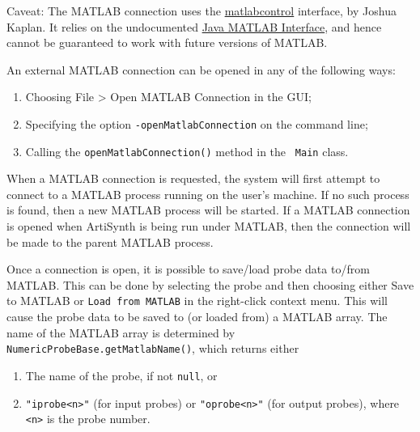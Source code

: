 \documentclass{article}
\begin{document}
\begin{sideblock}
Caveat: The MATLAB connection uses the
\href{https://code.google.com/p/matlabcontrol}{matlabcontrol}
interface, by Joshua Kaplan. It relies on the undocumented
\href{https://code.google.com/p/wiki/JMI}{Java MATLAB Interface}, and
hence cannot be guaranteed to work with future versions of MATLAB.
\end{sideblock}

An external MATLAB connection can be opened in any of the following
ways:

\begin{enumerate}

\item Choosing {\sf File > Open MATLAB Connection} in the GUI;

\item Specifying the option {\tt -openMatlabConnection} on
the command line;

\item Calling the {\tt openMatlabConnection()} method in the {\tt
Main} class.

\end{enumerate}

\begin{sideblock}
When a MATLAB connection is requested, the system will first attempt
to connect to a MATLAB process running on the user's machine. If no
such process is found, then a new MATLAB process will be started.  If
a MATLAB connection is opened when ArtiSynth is being run under
MATLAB, then the connection will be made to the parent MATLAB process.
\end{sideblock}

Once a connection is open, it is possible to save/load probe data
to/from MATLAB. This can be done by selecting the probe and then
choosing either {\sf Save to MATLAB} or {\tt Load from MATLAB} in the
right-click context menu. This will cause the probe data to be saved
to (or loaded from) a MATLAB array. The name of the MATLAB array is
determined by {\tt NumericProbeBase.getMatlabName()}, which returns
either

\begin{enumerate}

\item The name of the probe, if not {\tt null}, or

\item {\tt "iprobe<n>"} (for input probes) or {\tt "oprobe<n>"} (for
output probes), where {\tt <n>} is the probe number.

\end{enumerate}
\end{document}
